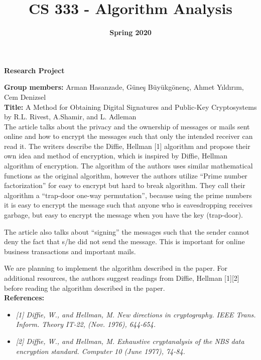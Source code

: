 \documentclass[11pt]{article}
\title{\huge\textbf{CS 333 - Algorithm Analysis}}
\date{\Large\textbf{Spring 2020}}
\begin{document}
\maketitle
\begin{center}
\LARGE\textbf{Research Project}
\\[2\baselineskip]
\end{center}
\setlength{\parindent}{0em}
\textbf{Group members:} Arman Hasanzade, Güneş Büyükgönenç, Ahmet Yıldırım, Cem Denizsel
\\[1\baselineskip]
\textbf{Title:} A Method for Obtaining Digital Signatures and Public-Key Cryptosystems by R.L. Rivest, A.Shamir, and L. Adleman
\\[2\baselineskip]
The article talks about the privacy and the ownership of messages or mails sent online and how to encrypt the messages such that only the intended receiver can read it. The writers describe the Diffie, Hellman [1] algorithm and propose their own idea and method of encryption, which is inspired by Diffie, Hellman algorithm of encryption. The algorithm of the authors uses similar mathematical functions as the original algorithm, however the authors utilize “Prime number factorization” for easy to encrypt but hard to break algorithm. They call their algorithm a “trap-door one-way permutation”, because using the prime numbers it is easy to encrypt the message such that anyone who is eavesdropping receives garbage, but easy to encrypt the message when you have the key (trap-door).

The article also talks about “signing” the messages such that the sender cannot deny the fact that s/he did not send the message. This is important for online business transactions and important mails.

We are planning to implement the algorithm described in the paper. For additional resources, the authors suggest readings from Diffie, Hellman [1][2] before reading the algorithm described in the paper.
\\[5\baselineskip]
\textbf{References:}
\begin{itemize}
	\item \textit{[1] Diffie, W., and Hellman, M. New directions in cryptography. IEEE Trans. Inform. Theory IT-22, (Nov. 1976), 644-654.}
	\item \textit{[2] Diffie, W., and Hellman, M. Exhaustive cryptanalysis of the NBS data encryption standard. Computer 10 (June 1977), 74-84.}
\end{itemize}
\end{document}

